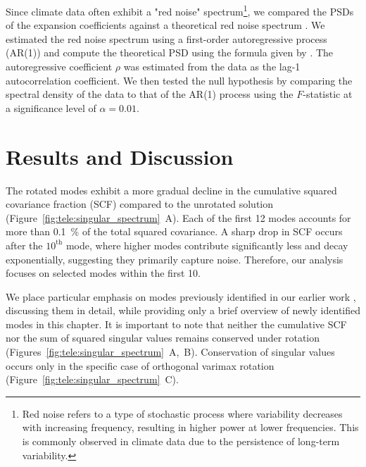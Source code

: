 Since climate data often exhibit a "red noise" spectrum\footnote{Red noise refers to a type of stochastic process where variability decreases with increasing frequency, resulting in higher power at lower frequencies. This is commonly observed in climate data due to the persistence of long-term variability.}, we compared the PSDs of the expansion coefficients against a theoretical red noise spectrum \cite[e.g.,][Section 10.3]{wilks_statistical_2019}. We estimated the red noise spectrum using a first-order autoregressive process (AR(1)) and compute the theoretical PSD using the formula given by \citet{gilman_power_1963}. The autoregressive coefficient $\rho$ was estimated from the data as the lag-1 autocorrelation coefficient. We then tested the null hypothesis by comparing the spectral density of the data to that of the AR(1) process using the $F$-statistic at a significance level of $\alpha = 0.01$.

\section{Results and Discussion}\label{sec:tele:results}

The rotated modes exhibit a more gradual decline in the cumulative squared covariance fraction (SCF) compared to the unrotated solution (Figure~\ref{fig:tele:singular_spectrum}~A). Each of the first 12 modes accounts for more than \qty{0.1}{\percent} of the total squared covariance. A sharp drop in SCF occurs after the $10^{\text{th}}$ mode, where higher modes contribute significantly less and decay exponentially, suggesting they primarily capture noise. Therefore, our analysis focuses on selected modes within the first 10.

We place particular emphasis on modes previously identified in our earlier work \cite{rieger_lagged_2021}, discussing them in detail, while providing only a brief overview of newly identified modes in this chapter. It is important to note that neither the cumulative SCF nor the sum of squared singular values remains conserved under rotation (Figures~\ref{fig:tele:singular_spectrum}~A,~B). Conservation of singular values occurs only in the specific case of orthogonal varimax rotation (Figure~\ref{fig:tele:singular_spectrum}~C).

